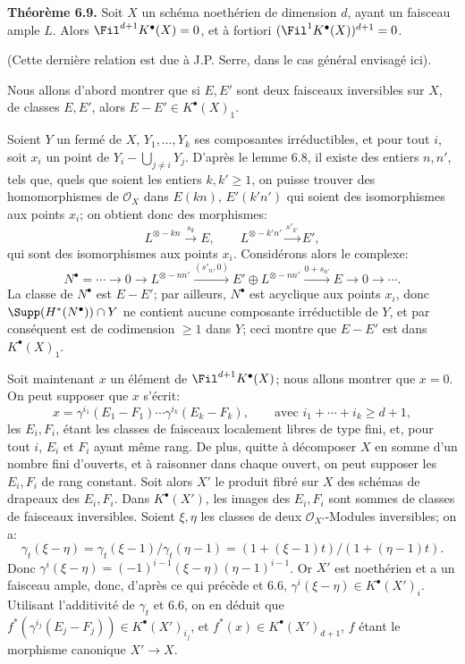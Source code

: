 \textbf{Théorème 6.9.} Soit $X$ un schéma noethérien de dimension $d$, ayant un faisceau ample $L$. Alors $\Fil^{d+1}K^{\bullet}(X)=0$, et à fortiori $(\Fil^1K^{\bullet}(X))^{d+1}=0$.

(Cette dernière relation est due à J.P. Serre, dans le cas général envisagé ici).

Nous allons d'abord montrer que si $E,E'$ sont deux faisceaux inversibles sur $X$, de classes $E,E'$, alors $E-E'\in K^{\bullet}(X)_1$.

Soient $Y$ un fermé de $X$, $Y_1,\ldots,Y_k$ ses composantes irréductibles, et pour tout $i$, soit $x_i$ un point de $Y_i-\bigcup_{j\ne i}Y_j$. D'après le lemme 6.8, il existe des entiers $n,n'$, tels que, quels que soient les entiers $k,k'\ge1$, on puisse trouver des homomorphismes de $\mathcal O_X$ dans $E(kn)$, $E'(k'n')$ qui soient des isomorphismes aux points $x_i$; on obtient donc des morphismes:
\[
  L^{\otimes -kn}\xrightarrow{s_k} E,
  \qquad
  L^{\otimes -k'n'}\xrightarrow{s'_{k'}} E',
\]
qui
sont des isomorphismes aux points $x_i$. Considérons alors le complexe:
\[
  N^\bullet=\cdots\to0\to L^{\otimes -nn'}
    \xrightarrow{(s'_n,0)} E'\oplus L^{\otimes -nn'}
    \xrightarrow{0+s_{n'}} E\to0\to\cdots.
\]
La classe de $N^\bullet$ est $E-E'$; par ailleurs, $N^\bullet$ est acyclique aux points $x_i$, donc $\Supp(H^*(N^\bullet))\cap Y$ ne contient aucune composante irréductible de $Y$, et par conséquent est de codimension $\ge1$ dans $Y$; ceci montre que $E-E'$ est dans $K^{\bullet}(X)_1$.

Soit maintenant $x$ un élément de $\Fil^{d+1}K^{\bullet}(X)$; nous allons montrer que $x=0$. On peut supposer que $x$ s'écrit:
\[
  x=\gamma^{i_1}(E_1-F_1)\cdots\gamma^{i_k}(E_k-F_k),
  \qquad\text{avec } i_1+\cdots+i_k\ge d+1,
\]
les $E_i,F_i$, étant les classes de faisceaux localement libres de type fini, et, pour tout $i$, $E_i$ et $F_i$ ayant même rang. De plus, quitte à décomposer $X$ en somme d'un nombre fini d'ouverts, et à raisonner dans chaque ouvert, on peut supposer les $E_i,F_i$ de rang constant. Soit alors $X'$ le produit fibré sur $X$ des schémas de drapeaux des $E_i,F_i$. Dans $K^{\bullet}(X')$, les images des $E_i,F_i$ sont sommes de classes de faisceaux inversibles. Soient $\xi,\eta$ les classes de deux $\mathcal O_{X'}$-Modules inversibles; on a:
\[
  \gamma_t(\xi-\eta)=\gamma_t(\xi-1)/\gamma_t(\eta-1)
  =(1+(\xi-1)t)/(1+(\eta-1)t).
\]
Donc $\gamma^i(\xi-\eta)=(-1)^{i-1}(\xi-\eta)(\eta-1)^{i-1}$. Or $X'$ est noethérien et a un faisceau ample, donc, d'après ce qui précède et 6.6, $\gamma^i(\xi-\eta)\in K^{\bullet}(X')_i$. Utilisant l'additivité de $\gamma_t$ et 6.6, on en déduit que $f^*(\gamma^{i_j}(E_j-F_j))\in K^{\bullet}(X')_{i_j}$, et $f^*(x)\in K^{\bullet}(X')_{d+1}$, $f$ étant le morphisme canonique $X'\to X$.

